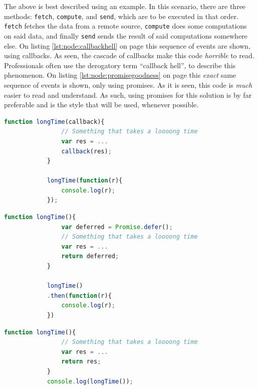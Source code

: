 		The above is best described using an example. In this scenario, there are three methods: \verb=fetch=, \verb=compute=, and \verb=send=, which are to be executed in that order. \verb=fetch= fetches the data from a remote source, \verb=compute= does some computations on said data, and finally \verb=send= sends the result of said computations somewhere else. On listing \ref{lst:node:callbackhell} on page \pageref{lst:node:callbackhell} this sequence of events are shown, using callbacks. As seen, the cascade of callbacks make this code \emph{horrible} to read. Professionals often use the derogatory term ``callback hell'', to describe this phenomenon. On listing \ref{lst:node:promisegoodness} on page \pageref{lst:node:promisegoodness} this \emph{exact} same sequence of events is shown, only using promises. As it is seen, this code is \emph{much} easier to read and understand. As such, using promises for this solution is by far preferable and is the style that will be used, whenever possible.


		\begin{lstlisting}[language=Javascript,gobble=12,caption={Using callbacks, in Node.js},label={lst:node:callback}]
            function longTime(callback){
                // Something that takes a loooong time
                var res = ...
                callback(res);
            }
            
            longTime(function(r){
                console.log(r);
            });
		\end{lstlisting}

		\begin{lstlisting}[language=Javascript,gobble=12,caption={Using promises, in Node.js},label={lst:node:promise}]
            function longTime(){
                var deferred = Promise.defer();
                // Something that takes a loooong time
                var res = ...
                return deferred;
            }
            
            longTime()
            .then(function(r){
                console.log(r);
            })
		\end{lstlisting}

		\begin{lstlisting}[language=Javascript,gobble=12,caption={The wrong way to do it, in Node.js},label={lst:node:wrong}]
            function longTime(){
                // Something that takes a loooong time
                var res = ...
                return res;
            }
            console.log(longTime());
		\end{lstlisting}
		

